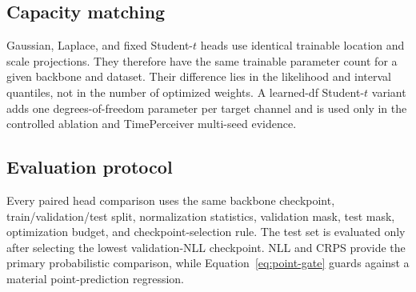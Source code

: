 \subsection{Capacity matching}

Gaussian, Laplace, and fixed Student-$t$ heads use identical trainable location and scale projections. They therefore have the same trainable parameter count for a given backbone and dataset. Their difference lies in the likelihood and interval quantiles, not in the number of optimized weights. A learned-df Student-$t$ variant adds one degrees-of-freedom parameter per target channel and is used only in the controlled ablation and TimePerceiver multi-seed evidence.

\subsection{Evaluation protocol}

Every paired head comparison uses the same backbone checkpoint, train/validation/test split, normalization statistics, validation mask, test mask, optimization budget, and checkpoint-selection rule. The test set is evaluated only after selecting the lowest validation-NLL checkpoint. NLL and CRPS provide the primary probabilistic comparison, while Equation~\ref{eq:point-gate} guards against a material point-prediction regression.
